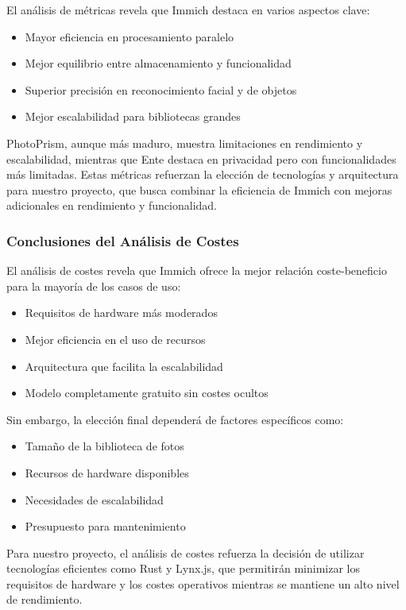 El análisis de métricas revela que Immich destaca en varios aspectos clave:

\begin{itemize}
    \item Mayor eficiencia en procesamiento paralelo
    \item Mejor equilibrio entre almacenamiento y funcionalidad
    \item Superior precisión en reconocimiento facial y de objetos
    \item Mejor escalabilidad para bibliotecas grandes
\end{itemize}

PhotoPrism, aunque más maduro, muestra limitaciones en rendimiento y escalabilidad, mientras que Ente destaca en privacidad pero con funcionalidades más limitadas. Estas métricas refuerzan la elección de tecnologías y arquitectura para nuestro proyecto, que busca combinar la eficiencia de Immich con mejoras adicionales en rendimiento y funcionalidad.

\subsubsection{Conclusiones del Análisis de Costes}

El análisis de costes revela que Immich ofrece la mejor relación coste-beneficio para la mayoría de los casos de uso:

\begin{itemize}
    \item Requisitos de hardware más moderados
    \item Mejor eficiencia en el uso de recursos
    \item Arquitectura que facilita la escalabilidad
    \item Modelo completamente gratuito sin costes ocultos
\end{itemize}

Sin embargo, la elección final dependerá de factores específicos como:
\begin{itemize}
    \item Tamaño de la biblioteca de fotos
    \item Recursos de hardware disponibles
    \item Necesidades de escalabilidad
    \item Presupuesto para mantenimiento
\end{itemize}

Para nuestro proyecto, el análisis de costes refuerza la decisión de utilizar tecnologías eficientes como Rust y Lynx.js, que permitirán minimizar los requisitos de hardware y los costes operativos mientras se mantiene un alto nivel de rendimiento.

